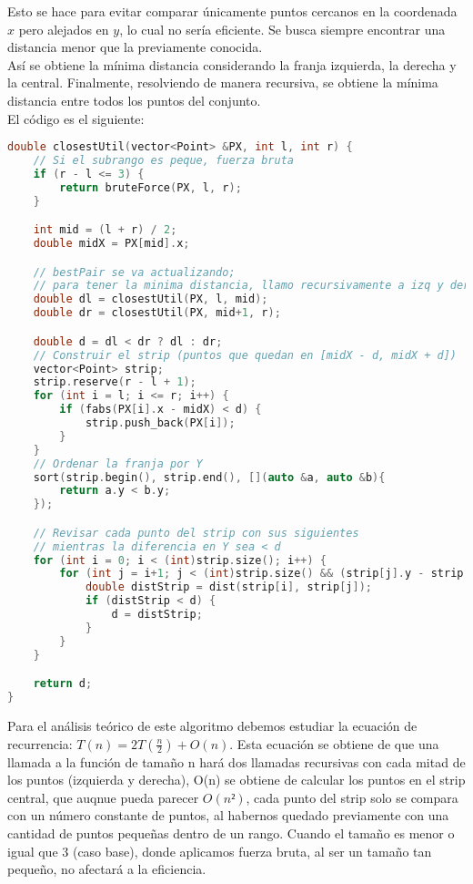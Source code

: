 \documentclass[a4paper,12pt]{article}
\begin{document}
Esto se hace para evitar comparar únicamente puntos cercanos en la coordenada $x$ pero alejados en $y$, 
lo cual no sería eficiente. Se busca siempre encontrar una distancia menor que la previamente conocida.\\

Así se obtiene la mínima distancia considerando la franja izquierda, la derecha y la central. 
Finalmente, resolviendo de manera recursiva, se obtiene la mínima distancia entre todos los puntos del conjunto.\\


El código es el siguiente:

\begin{lstlisting}[language=C++, caption={Divide y vencerás de \textbf{``El par de puntos más cercano''}}]
double closestUtil(vector<Point> &PX, int l, int r) {
	// Si el subrango es peque, fuerza bruta
	if (r - l <= 3) {
		return bruteForce(PX, l, r);
	}

	int mid = (l + r) / 2;
	double midX = PX[mid].x;

	// bestPair se va actualizando; 
	// para tener la minima distancia, llamo recursivamente a izq y der
	double dl = closestUtil(PX, l, mid);
	double dr = closestUtil(PX, mid+1, r);

	double d = dl < dr ? dl : dr;
	// Construir el strip (puntos que quedan en [midX - d, midX + d])
	vector<Point> strip;
	strip.reserve(r - l + 1);
	for (int i = l; i <= r; i++) {
		if (fabs(PX[i].x - midX) < d) {
			strip.push_back(PX[i]);
		}
	}
	// Ordenar la franja por Y
	sort(strip.begin(), strip.end(), [](auto &a, auto &b){
		return a.y < b.y;
	});

	// Revisar cada punto del strip con sus siguientes
	// mientras la diferencia en Y sea < d
	for (int i = 0; i < (int)strip.size(); i++) {
		for (int j = i+1; j < (int)strip.size() && (strip[j].y - strip[i].y) < d; j++) {
			double distStrip = dist(strip[i], strip[j]);
			if (distStrip < d) {
				d = distStrip;
			}
		}
	}

	return d;
}
\end{lstlisting}

Para el análisis teórico de este algoritmo debemos estudiar la ecuación de recurrencia: $T(n) = 2T(\frac{n}{2}) + O(n)$.
Esta ecuación se obtiene de que una llamada a la función de tamaño n hará dos llamadas recursivas con cada mitad de los puntos (izquierda y derecha),
O(n) se obtiene de calcular los puntos en el strip central, que auqnue pueda parecer $O(n²)$, cada punto del strip solo 
se compara con un número constante de puntos, al habernos quedado previamente con una cantidad de puntos pequeñas dentro de un rango.
Cuando el tamaño es menor o igual que 3 (caso base), donde aplicamos 
fuerza bruta, al ser un tamaño tan pequeño, no afectará a la eficiencia.\\
\end{document}

